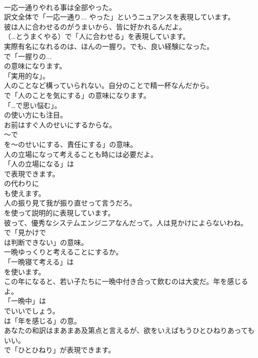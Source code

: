 \documentclass[8pt]{extreport}
\begin{document}
\begin{CJK}{UTF8}{min}
\\	一応一通りやれる事は全部やった。 
\\	訳文全体で「一応一通り... やった」というニュアンスを表現しています。	
\\	彼は人に合わせるのがうまいから、皆に好かれるんだよ。 
\\	（…とうまくやる）で「人に合わせる」を表現しています。	
\\	実際有名になれるのは、ほんの一握り。でも、良い経験になった。 
\\	で「一握りの... 
\\	の意味になります。
\\	「実用的な」。	
\\	人のことなど構っていられない。自分のことで精一杯なんだから。 
\\	で「人のことを気にする」の意味になります。
\\	「…で思い悩む」。
\\	の使い方にも注目。	
\\	お前はすぐ人のせいにするからな。 
\\	～で
\\	を～のせいにする、責任にする」の意味。	
\\	人の立場になって考えることも時には必要だよ。 
\\	「人の立場になる」は
\\	で表現できます。
\\	の代わりに
\\	も使えます。	
\\	人の振り見て我が振り直せって言うだろ。 
\\	を使って説明的に表現しています。	
\\	彼って、優秀なシステムエンジニアなんだって。人は見かけによらないわね。 
\\	で「見かけで 
\\	は判断できない」の意味。	
\\	一晩ゆっくりと考えることにするか。 
\\	「一晩寝て考える」は
\\	を使います。	
\\	この年になると、若い子たちに一晩中付き合って飲むのは大変だ。年を感じるよ。 
\\	「一晩中」は 
\\	でいいでしょう。
\\	は「年を感じる」の意。	
\\	あなたの和訳はまあまあ及第点と言えるが、欲をいえばもうひとひねりあってもいい。 
\\	で「ひとひねり」が表現できます。	

\end{CJK}
\end{document}
